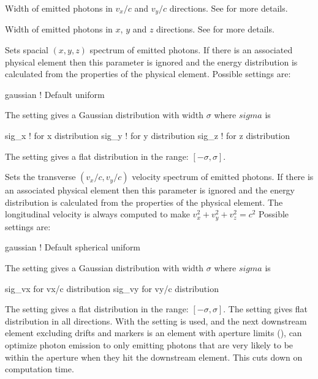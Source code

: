 {\begin{description}
  \item[\vn{sig_vx, sig_vy}] \Newline
Width of emitted photons in $v_x/c$ and $v_y/c$ directions. See
 for more details.

  \item[\vn{sig_x, sig_y, sig_z}] \Newline
Width of emitted photons in $x$, $y$ and $z$ directions. See
 for more details.

  \item[\vn{spatial_distribution}] \Newline
Sets spacial $(x, y, z)$ spectrum of emitted photons. If there is an associated physical element
then this parameter is ignored and the energy distribution is calculated from the properties of the
physical element. Possible settings are:
\begin{example2}
  gaussian    ! Default
  uniform
\end{example2}
The  setting gives a Gaussian distribution with width
$\sigma$ where $sigma$ is 
\begin{example2}
  sig_x     ! for x distribution
  sig_y     ! for y distribution
  sig_z     ! for z distribution
\end{example2}
The  setting gives a flat
distribution in the range: $[-\sigma, \sigma]$.

  \item[\vn{velocity_distribution}] \Newline
Sets the transverse $(v_x/c, v_y/c)$ velocity spectrum of emitted photons. If there is an associated
physical element then this parameter is ignored and the energy distribution is calculated from the
properties of the physical element. The longitudinal velocity is always computed to make $v_x^2 +
v_y^2 + v_z^2 = c^2$ Possible settings are:
\begin{example2}
  gaussian    ! Default
  spherical
  uniform
\end{example2}
The  setting gives a Gaussian distribution with width
$\sigma$ where $sigma$ is 
\begin{example2}
  sig_vx     for vx/c distribution
  sig_vy     for vy/c distribution
\end{example2}
The  setting gives a flat distribution in the range: $[-\sigma, \sigma]$. The
 setting gives flat distribution in all directions. With the 
setting is used, and the next downstream element excluding drifts and markers is an element
with aperture limits (), \bmad can optimize photon emission to only emitting 
photons that are very likely to be within the aperture when they hit the downstream element.
This cuts down on computation time.


\end{description}}
